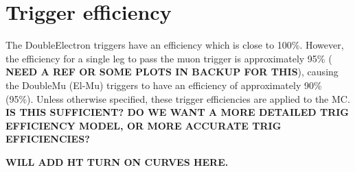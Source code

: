 \section{Trigger efficiency}
\label{sec:trgEff}

The DoubleElectron triggers have an efficiency which is close to 100\%. However, the efficiency for a single
leg to pass the muon trigger is approximately 95\% ({\color{red} \bf NEED A REF OR SOME PLOTS IN BACKUP FOR THIS}),
causing the DoubleMu (El-Mu) triggers to have an efficiency of approximately 90\% (95\%). Unless otherwise
specified, these trigger efficiencies are applied to the MC. 
{\color{red} \bf IS THIS SUFFICIENT? DO WE WANT A MORE DETAILED TRIG EFFICIENCY MODEL, OR MORE ACCURATE TRIG EFFICIENCIES?}


{\color{red} \bf WILL ADD HT TURN ON CURVES HERE.}


